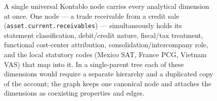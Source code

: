 \begin{figure}[!htbp]
{%
}
\caption{A single universal Kontablo node carries every analytical dimension
at once. One node --- a trade receivable from a credit sale
(\texttt{asset.current.receivables}) --- simultaneously holds its statement
classification, debit/credit nature, fiscal/tax treatment, functional
cost-center attribution, consolidation/intercompany role, and the local
statutory codes (Mexico SAT, France PCG, Vietnam VAS) that map into it. In a
single-parent tree each of these dimensions would require a separate hierarchy
and a duplicated copy of the account; the graph keeps one canonical node and
attaches the dimensions as coexisting properties and edges.}
\label{fig:node_dimensions}
\end{figure}
